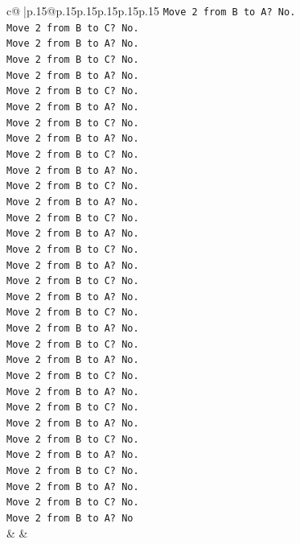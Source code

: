 \documentclass{article}
\begin{document}
{\begin{supertabular}{c@{$\;$}|p{.15\linewidth}@{}p{.15\linewidth}p{.15\linewidth}p{.15\linewidth}p{.15\linewidth}p{.15\linewidth}}
{{{\texttt{Move 2 from B to A? No.} \\
\texttt{Move 2 from B to C? No.} \\
\texttt{Move 2 from B to A? No.} \\
\texttt{Move 2 from B to C? No.} \\
\texttt{Move 2 from B to A? No.} \\
\texttt{Move 2 from B to C? No.} \\
\texttt{Move 2 from B to A? No.} \\
\texttt{Move 2 from B to C? No.} \\
\texttt{Move 2 from B to A? No.} \\
\texttt{Move 2 from B to C? No.} \\
\texttt{Move 2 from B to A? No.} \\
\texttt{Move 2 from B to C? No.} \\
\texttt{Move 2 from B to A? No.} \\
\texttt{Move 2 from B to C? No.} \\
\texttt{Move 2 from B to A? No.} \\
\texttt{Move 2 from B to C? No.} \\
\texttt{Move 2 from B to A? No.} \\
\texttt{Move 2 from B to C? No.} \\
\texttt{Move 2 from B to A? No.} \\
\texttt{Move 2 from B to C? No.} \\
\texttt{Move 2 from B to A? No.} \\
\texttt{Move 2 from B to C? No.} \\
\texttt{Move 2 from B to A? No.} \\
\texttt{Move 2 from B to C? No.} \\
\texttt{Move 2 from B to A? No.} \\
\texttt{Move 2 from B to C? No.} \\
\texttt{Move 2 from B to A? No.} \\
\texttt{Move 2 from B to C? No.} \\
\texttt{Move 2 from B to A? No.} \\
\texttt{Move 2 from B to C? No.} \\
\texttt{Move 2 from B to A? No.} \\
\texttt{Move 2 from B to C? No.} \\
\texttt{Move 2 from B to A? No} \\
            }
        }
    }
    & & \\ \\


\end{supertabular}}
\end{document}
